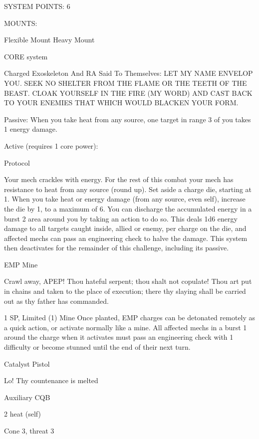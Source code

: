                                              SYSTEM POINTS: 6

                                                   MOUNTS:

 Flexible Mount                                         Heavy Mount

                                                 CORE system




                                             Charged Exoskeleton
 And RA Said To Themselves: LET MY NAME ENVELOP YOU. SEEK NO SHELTER FROM THE FLAME
 OR THE TEETH OF THE BEAST. CLOAK YOURSELF IN THE FIRE (MY WORD) AND CAST BACK TO
 YOUR ENEMIES THAT WHICH WOULD BLACKEN YOUR FORM.


 Passive: When you take heat from any source, one target in range 3 of you takes 1 energy damage.

 Active (requires 1 core power):

  Protocol

 Your mech crackles with energy. For the rest of this combat your mech has resistance to heat from any
 source (round up). Set aside a charge die, starting at 1. When you take heat or energy damage (from
 any source, even self), increase the die by 1, to a maximum of 6. You can discharge the accumulated
 energy in a burst 2 area around you by taking an action to do so. This deals 1d6 energy damage to all
 targets caught inside, allied or enemy, per charge on the die, and affected mechs can pass an
 engineering check to halve the damage. This system then deactivates for the remainder of this
 challenge, including its passive.

EMP Mine

Crawl away, APEP! Thou hateful serpent; thou shalt not copulate! Thou art put in chains and taken to the
place of execution; there thy slaying shall be carried out as thy father has commanded.

1 SP, Limited (1)
Mine
Once planted, EMP charges can be detonated remotely as a quick action, or activate normally
like a mine. All affected mechs in a burst 1 around the charge when it activates must pass an
engineering check with 1 difficulty or become stunned until the end of their next turn.


Catalyst Pistol

Lo! Thy countenance is melted

Auxiliary CQB

2 heat (self)

Cone 3, threat 3

